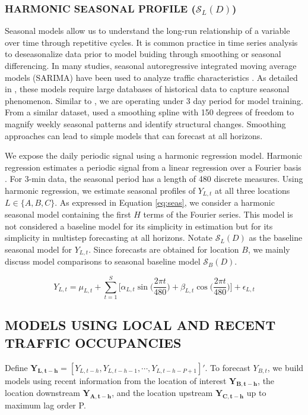 \subsubsection{HARMONIC SEASONAL PROFILE ($\mathcal{S}_L(D)$)}
Seasonal models allow us to understand the long-run relationship of a variable over time through repetitive cycles. It is common practice in time series analysis to deseasonalize data prior to model buiding through smoothing or seasonal differencing. In many studies, seasonal autoregressive integrated moving average models (SARIMA) have been used to analyze traffic characteristics \citep{Williams2003, Ghosh2005, Zhang2011}. As detailed in \cite{Kumar2015}, these models require large databases of historical data to capture seasonal phenomenon. Similar to \cite{Kumar2015}, we are operating under 3 day period for model training. From a similar dataset, \cite{Kamarianakis2010} used a smoothing spline with 150 degrees of freedom to magnify weekly seasonal patterns and identify structural changes. Smoothing approaches can lead to simple models that can forecast at all horizons.

We expose the daily periodic signal using a harmonic regression model. Harmonic regression estimates a periodic signal from a linear regression over a Fourier basis \citep{Metcalfe2009}. For 3-min data, the seasonal period has a length of 480 discrete measures. Using harmonic regression, we estimate seasonal profiles of $Y_{L,t}$ at all three locations $L \in \{A,B,C\}$.  As expressed in Equation \ref{eq:seas}, we consider a harmonic seasonal model containing the first $H$ terms of the Fourier series.  This model is not considered a baseline model for its simplicity in estimation but for its simplicity in multistep forecasting at all horizons. Notate $\mathcal{S}_L(D)$ as the baseline seasonal model for $Y_{L,t}$. Since forecasts are obtained for location $B$, we mainly discuss model comparisons to seasonal baseline model $\mathcal{S}_B(D)$.

\begin{equation}
\label{eq:seas}
Y_{L,t}=\mu_{L,t}+\sum\limits_{t=1}^{S} \Big[\alpha_{L,t}\sin\Big(\frac{2\pi t}{480}\Big)+\beta_{L,t}\cos\Big(\frac{2\pi t}{480}\Big)\Big]+\epsilon_{L,t}
\end{equation}

\subsection{MODELS USING LOCAL AND RECENT TRAFFIC OCCUPANCIES}
Define $\bm{Y_{L,t-h}}=[Y_{L,t-h},Y_{L,t-h-1},\cdots,Y_{L,t-h-P+1}]'$. To forecast $Y_{B,t}$, we build models using recent information from the location of interest  $\bm{Y_{B,t-h}}$, the location downstream $\bm{Y_{A,t-h}}$, and the location upstream $\bm{Y_{C,t-h}}$ up to maximum lag order P. 

